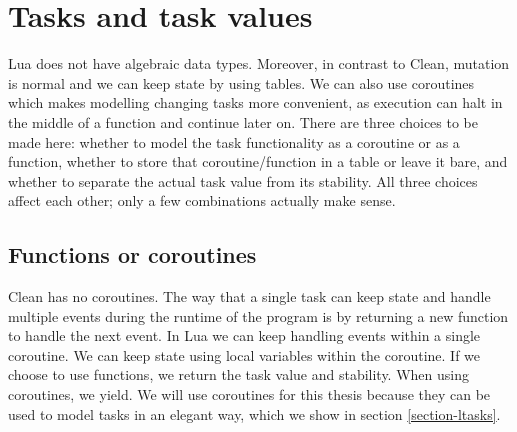 \section{Tasks and task values}\label{section-task-values}
Lua does not have algebraic data types. Moreover, in contrast to Clean, mutation is normal and we can keep state by using tables. We can also use coroutines which makes modelling changing tasks more convenient, as execution can halt in the middle of a function and continue later on. There are three choices to be made here: whether to model the task functionality as a coroutine or as a function, whether to store that coroutine/function in a table or leave it bare, and whether to separate the actual task value from its stability. All three choices affect each other; only a few combinations actually make sense.

\subsection{Functions or coroutines}\label{section-task-values-fn-coroutine}
Clean has no coroutines. The way that a single task can keep state and handle multiple events during the runtime of the program is by returning a new function to handle the next event. In Lua we can keep handling events within a single coroutine. We can keep state using local variables within the coroutine. If we choose to use functions, we return the task value and stability. When using coroutines, we yield. We will use coroutines for this thesis because they can be used to model tasks in an elegant way, which we show in section \ref{section-ltasks}.

